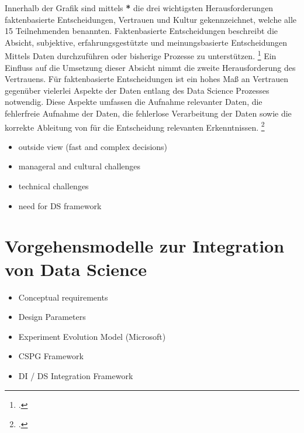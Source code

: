 Innerhalb der Grafik sind mittels \textbf{*} die drei wichtigsten Herausforderungen faktenbasierte Entscheidungen, Vertrauen und Kultur gekennzeichnet, welche alle 15 Teilnehmenden benannten.
Faktenbasierte Entscheidungen beschreibt die Absicht, subjektive, erfahrungsgestützte und meinungsbasierte Entscheidungen Mittels Daten durchzuführen oder bisherige Prozesse zu unterstützen. \footcite[Vgl.][S. 9]{Dalpiaz.2020}
Ein Einfluss auf die Umsetzung dieser Absicht nimmt die zweite Herausforderung des Vertrauens.
Für faktenbasierte Entscheidungen ist ein hohes Maß an Vertrauen gegenüber vielerlei Aspekte der Daten entlang des Data Science Prozesses notwendig.
Diese Aspekte umfassen die Aufnahme relevanter Daten, die fehlerfreie Aufnahme der Daten, die fehlerlose Verarbeitung der Daten sowie die korrekte Ableitung von für die Entscheidung relevanten Erkenntnissen. \footcite[Vgl.][S. 10]{Dalpiaz.2020}


\begin{itemize}
    \item outside view (fast and complex decisions)
    \item manageral and cultural challenges
    \item technical challenges
    \item need for DS framework
\end{itemize}

\section{Vorgehensmodelle zur Integration von Data Science}

\begin{itemize}
    \item Conceptual requirements
    \item Design Parameters
    \item Experiment Evolution Model (Microsoft)
    \item CSPG Framework
    \item DI / DS Integration Framework
\end{itemize}